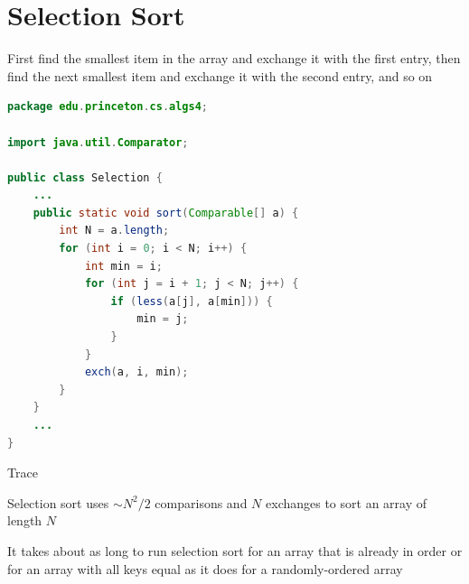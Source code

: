 \documentclass[8pt,a4paper,compress]{beamer}
\begin{document}
\section{Selection Sort}
\begin{frame}[fragile]
\pause

First find the smallest item in the array and exchange it with the first entry, then find the next smallest item and exchange it with the second entry, and so on

\pause
\bigskip

\begin{lstlisting}[language=Java]
package edu.princeton.cs.algs4;

import java.util.Comparator;

public class Selection {
    ...
    public static void sort(Comparable[] a) {
        int N = a.length;
        for (int i = 0; i < N; i++) {
            int min = i;
            for (int j = i + 1; j < N; j++) {
                if (less(a[j], a[min])) { 
                    min = j;
                }
            }
            exch(a, i, min);
        }
    }
    ...
}
\end{lstlisting}
\end{frame}

\begin{frame}[fragile]
\pause

Trace
\begin{center}
\end{center}
\end{frame}

\begin{frame}[fragile]
\pause

Selection sort uses $\sim N^2/2$ comparisons and $N$ exchanges to sort an array of length $N$

\pause
\bigskip

It takes about as long to run selection sort for an array that is already in order or for an array with all keys equal as it does for a randomly-ordered array
\end{frame}
\end{document}
